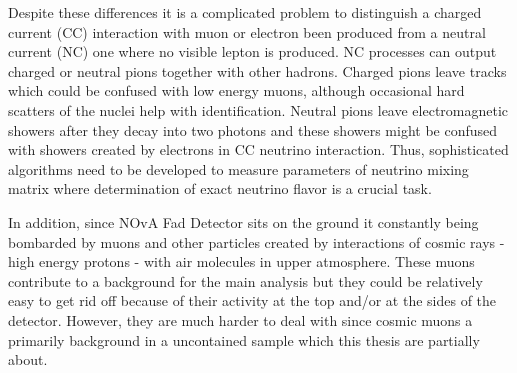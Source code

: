 Despite these differences it is a complicated problem to distinguish a charged current (CC) interaction with 
muon or electron been produced from a neutral current (NC) one where no visible lepton is produced.
NC processes can output charged or neutral pions together with other hadrons. Charged pions
leave tracks which could be confused with low energy muons, although occasional hard scatters of the 
nuclei help with identification. Neutral pions leave electromagnetic showers after they decay into two
photons and these showers might be confused with showers created by electrons in CC neutrino interaction.
Thus, sophisticated algorithms need to be developed to measure parameters of neutrino mixing matrix where 
determination of exact neutrino flavor is a crucial task.

In addition, since NOvA Fad Detector sits on the ground it constantly being bombarded by muons and other
particles created by interactions of cosmic rays - high energy protons - with air molecules in upper atmosphere. 
These muons contribute to a background for the main analysis but they could be relatively easy to get rid off
because of their activity at the top and/or at the sides of the detector. However, they are much harder to deal
with since cosmic muons a primarily background in a uncontained sample which this thesis are partially about.

